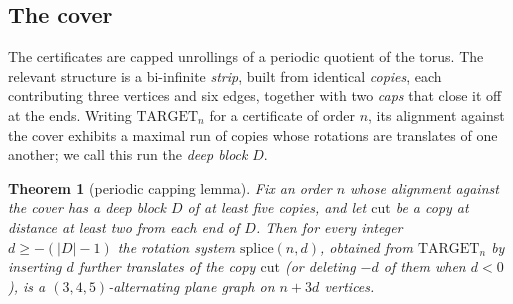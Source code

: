 \documentclass{baustms}
\theoremstyle{cupthm}
\newtheorem{theorem}{Theorem}[section]
\theoremstyle{cupdefn}
\theoremstyle{cuprem}
\begin{document}
\subsection{The cover}

The certificates are capped unrollings of a periodic quotient of the torus. The
relevant structure is a bi-infinite \emph{strip}, built from identical
\emph{copies}, each contributing three vertices and six edges, together with two
\emph{caps} that close it off at the ends. Writing $\mathrm{TARGET}_n$ for a
certificate of order $n$, its alignment against the cover exhibits a maximal run
of copies whose rotations are translates of one another; we call this run the
\emph{deep block} $D$.

\begin{theorem}[periodic capping lemma]\label{thm:pumping}
Fix an order $n$ whose alignment against the cover has a deep block $D$ of at
least five copies, and let $\mathrm{cut}$ be a copy at distance at least two
from each end of $D$. Then for every integer $d \ge -(|D| - 1)$ the rotation
system $\mathrm{splice}(n,d)$, obtained from $\mathrm{TARGET}_n$ by inserting
$d$ further translates of the copy $\mathrm{cut}$ (or deleting $-d$ of them when
$d < 0$), is a $(3,4,5)$-alternating plane graph on $n + 3d$ vertices.
\end{theorem}
\end{document}
